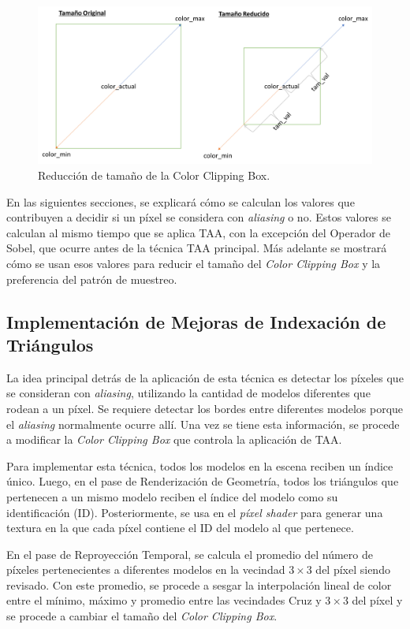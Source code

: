 \documentclass[pregrado]{tesis-usb} %
\begin{document}
\begin{figure}[!hbt]
	\centering
	\includegraphics[scale=0.3]{images/clipping_box_reduction.png}
	\caption{Reducción de tamaño de la Color Clipping Box.}\label{fig:colorclippingboxredux}
\end{figure}

En las siguientes secciones, se explicará cómo se calculan los valores que contribuyen a decidir si un píxel se considera con \textit{aliasing} o no. Estos valores se calculan al mismo tiempo que se aplica TAA, con la excepción del Operador de Sobel, que ocurre antes de la técnica TAA principal. Más adelante se mostrará cómo se usan esos valores para reducir el tamaño del \textit{Color Clipping Box} y la preferencia del patrón de muestreo.

\subsection{Implementación de Mejoras de Indexación de Triángulos}
La idea principal detrás de la aplicación de esta técnica es detectar los píxeles que se consideran con \textit{aliasing}, utilizando la cantidad de modelos diferentes que rodean a un píxel. Se requiere detectar los bordes entre diferentes modelos porque el \textit{aliasing} normalmente ocurre allí. Una vez se tiene esta información, se procede a modificar la \textit{Color Clipping Box} que controla la aplicación de TAA.

Para implementar esta técnica, todos los modelos en la escena reciben un índice único. Luego, en el pase de Renderización de Geometría, todos los triángulos que pertenecen a un mismo modelo reciben el índice del modelo como su identificación (ID). Posteriormente, se usa en el \textit{píxel shader} para generar una textura en la que cada píxel contiene el ID del modelo al que pertenece.

En el pase de Reproyección Temporal, se calcula el promedio del número de píxeles pertenecientes a diferentes modelos en la vecindad $3\times 3$ del píxel siendo revisado. Con este promedio, se procede a sesgar la interpolación lineal de color entre el mínimo, máximo y promedio entre las vecindades Cruz y $3\times 3$ del píxel y se procede a cambiar el tamaño del \textit{Color Clipping Box}.
\end{document}
